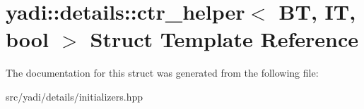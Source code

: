 \hypertarget{structyadi_1_1details_1_1ctr__helper}{}\section{yadi\+:\+:details\+:\+:ctr\+\_\+helper$<$ BT, IT, bool $>$ Struct Template Reference}
\label{structyadi_1_1details_1_1ctr__helper}


The documentation for this struct was generated from the following file\+:\begin{DoxyCompactItemize}
\item 
src/yadi/details/initializers.\+hpp\end{DoxyCompactItemize}
